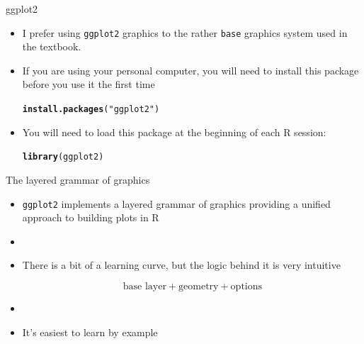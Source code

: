 \documentclass[10pt]{beamer}\usepackage[]{graphicx}\usepackage[]{color}
\makeatletter
\newcommand{\hlstr}[1]{\textcolor[rgb]{0.192,0.494,0.8}{#1}}%
\newcommand{\hlstd}[1]{\textcolor[rgb]{0.345,0.345,0.345}{#1}}%
\newcommand{\hlkwd}[1]{\textcolor[rgb]{0.737,0.353,0.396}{\textbf{#1}}}%
\newenvironment{kframe}{%
 \def\at@end@of@kframe{}%
 \ifinner\ifhmode%
  \def\at@end@of@kframe{\end{minipage}}%
  \begin{minipage}{\columnwidth}%
 \fi\fi%
 \def\FrameCommand##1{\hskip\@totalleftmargin \hskip-\fboxsep
 \colorbox{shadecolor}{##1}\hskip-\fboxsep
     \hskip-\linewidth \hskip-\@totalleftmargin \hskip\columnwidth}%
 \MakeFramed {\advance\hsize-\width
   \@totalleftmargin\z@ \linewidth\hsize
   \@setminipage}}%
 {\par\unskip\endMakeFramed%
 \at@end@of@kframe}
\newenvironment{knitrout}{}{} %
\makeatother
\begin{document}
\begin{frame}[fragile]{ggplot2}

\begin{itemize}
\item I prefer using \texttt{ggplot2} graphics to the rather \texttt{base} graphics system used in the textbook.

\item If you are using your personal computer, you will need to install
this package before you use it the first time

\begin{knitrout}\small
{}\color{fgcolor}\begin{kframe}
\begin{alltt}
\hlkwd{install.packages}\hlstd{(}\hlstr{"ggplot2"}\hlstd{)}
\end{alltt}
\end{kframe}
\end{knitrout}

\item You will need to load this package at the beginning of each R session:

\begin{knitrout}\small
{}\color{fgcolor}\begin{kframe}
\begin{alltt}
\hlkwd{library}\hlstd{(ggplot2)}
\end{alltt}
\end{kframe}
\end{knitrout}

\end{itemize}

\end{frame}

\begin{frame}[fragile]{The layered grammar of graphics}

\begin{itemize}
\item \texttt{ggplot2} implements a layered grammar of graphics providing a unified approach to building plots in R

\item[]

\item There is a bit of a learning curve, but the logic behind it is very intuitive

$$\text{base layer} + \text{geometry} + \text{options}$$

\item[]
\item It's easiest to learn by example

\end{itemize}


\end{frame}
\end{document}
